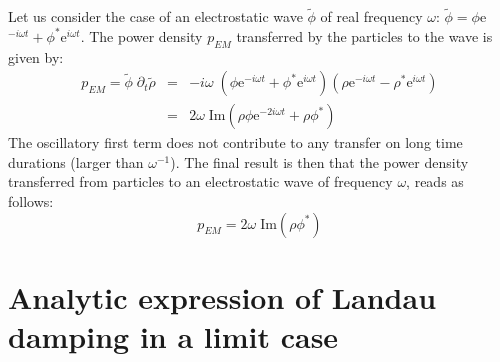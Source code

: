 \documentclass[11pt]{article}
\begin{document}
Let us consider the case of an electrostatic wave $\tilde\phi$ of real frequency $\omega$: $\tilde\phi = \phi$e$^{-i\omega t}+\phi^*$e$^{i\omega t}$. The power density $p_{EM}$ transferred by the particles to the wave is given by:
\begin{eqnarray*}
  p_{EM} = \tilde\phi \;\partial_t \tilde\rho
  &=& -i\omega\;
  \left( \phi \textrm{e}^{-i\omega t}+\phi^*\textrm{e}^{i\omega t} \right)
  \left( \rho \textrm{e}^{-i\omega t}-\rho^*\textrm{e}^{i\omega t}
  \right)\\
  &=& 2\omega\;\textrm{Im}
  \left( \rho\phi \textrm{e}^{-2i\omega t}+\rho\phi^*\right)
\end{eqnarray*}
The oscillatory first term does not contribute to any transfer on long time durations (larger than $\omega^{-1}$). The final result is then that the power density transferred from particles to an electrostatic wave of frequency $\omega$, reads as follows:
\begin{equation}
  p_{EM} = 2\omega\;\textrm{Im} (\rho\phi^*)
\end{equation}


\section{Analytic expression of Landau damping in a limit case}
\label{Appendix_gamma_Landau}
\end{document}
